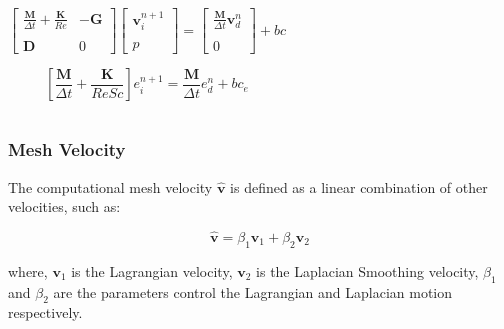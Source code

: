 \begin{frame}
\begin{columns}[c]
\begin{center}
\[
\begin{bmatrix}
\frac{\mathbf{M}}{\Delta t} + \frac{\mathbf{K}}{Re} & -\mathbf{G}\\
\\
\mathbf{D} & 0
\end{bmatrix}
\begin{bmatrix}
\textbf{v}_{i}^{n+1}\\
\\
p
\end{bmatrix}
=
\begin{bmatrix}
\frac{\mathbf{M}}{\Delta t} \textbf{v}_{d}^{n}\\
\\
0
\end{bmatrix}
+ bc
\]

\medskip
\begin{equation*}
 \left[ \frac{\mathbf{M}}{\Delta t} + \frac{\mathbf{K}}{ReSc} \right] e_{i}^{n+1} = \frac{\mathbf{M}}{\Delta t} e_{d}^{n} + bc_{e}
\end{equation*}
\end{center}

\end{columns}

\end{frame}








\begin{frame}
 \frametitle{\LARGE Mesh Velocity}

\vspace{-1.5cm}
\justifying
The computational mesh velocity $\mathbf{\hat{v}}$ is defined as
a linear combination of other velocities, such as:

\vspace{1cm}
\begin{equation*}
\mathbf{\hat{v}} = \beta_{1}\textbf{v}_{1} + \beta_{2}\textbf{v}_{2}
\end{equation*}

\vspace{1cm}
where,
$\mathbf{v}_{1}$ is the Lagrangian velocity,
$\mathbf{v}_{2}$ is the Laplacian Smoothing velocity,
$\beta_{1}$ and $\beta_{2}$ are 
the parameters control the Lagrangian and Laplacian motion respectively.

\end{frame}






